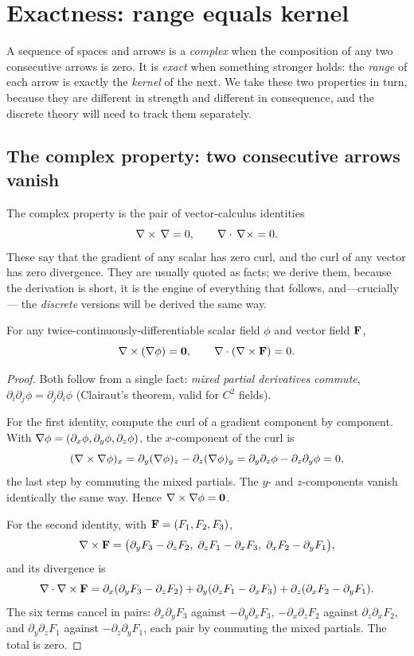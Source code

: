 \section{Exactness: range equals kernel}

A sequence of spaces and arrows is a \emph{complex} when the composition of any two
consecutive arrows is zero. It is \emph{exact} when something stronger holds: the
\emph{range} of each arrow is exactly the \emph{kernel} of the next. We take these
two properties in turn, because they are different in strength and different in
consequence, and the discrete theory will need to track them separately.

\subsection{The complex property: two consecutive arrows vanish}

The complex property is the pair of vector-calculus identities
\[
  \nabla\times\,\nabla = 0, \qquad \nabla\cdot\,\nabla\times = 0.
\]
These say that the gradient of any scalar has zero curl, and the curl of any vector
has zero divergence. They are usually quoted as facts; we derive them, because the
derivation is short, it is the engine of everything that follows, and---crucially---
the \emph{discrete} versions will be derived the same way.

\begin{lemma}\label{lem:complex}
For any twice-continuously-differentiable scalar field $\phi$ and vector field $\mathbf{F}$,
\[
  \nabla\times(\nabla\phi) = \mathbf{0}, \qquad \nabla\cdot(\nabla\times\mathbf{F}) = 0.
\]
\end{lemma}

\begin{proof}
Both follow from a single fact: \emph{mixed partial derivatives commute},
$\partial_i\partial_j\phi=\partial_j\partial_i\phi$ (Clairaut's theorem, valid for
$C^2$ fields).

For the first identity, compute the curl of a gradient component by component. With
$\nabla\phi=(\partial_x\phi,\partial_y\phi,\partial_z\phi)$, the $x$-component of the
curl is
\[
  (\nabla\times\nabla\phi)_x
  = \partial_y(\nabla\phi)_z - \partial_z(\nabla\phi)_y
  = \partial_y\partial_z\phi - \partial_z\partial_y\phi
  = 0,
\]
the last step by commuting the mixed partials. The $y$- and $z$-components vanish
identically the same way. Hence $\nabla\times\nabla\phi=\mathbf 0$.

For the second identity, with $\mathbf{F}=(F_1,F_2,F_3)$,
\[
  \nabla\times\mathbf{F}
  = \bigl(\partial_y F_3 - \partial_z F_2,\;
          \partial_z F_1 - \partial_x F_3,\;
          \partial_x F_2 - \partial_y F_1\bigr),
\]
and its divergence is
\[
  \nabla\cdot\nabla\times\mathbf{F}
  = \partial_x(\partial_y F_3 - \partial_z F_2)
  + \partial_y(\partial_z F_1 - \partial_x F_3)
  + \partial_z(\partial_x F_2 - \partial_y F_1).
\]
The six terms cancel in pairs: $\partial_x\partial_y F_3$ against
$-\partial_y\partial_x F_3$, $-\partial_x\partial_z F_2$ against
$\partial_z\partial_x F_2$, and $\partial_y\partial_z F_1$ against
$-\partial_z\partial_y F_1$, each pair by commuting the mixed partials. The total is
zero.
\end{proof}

